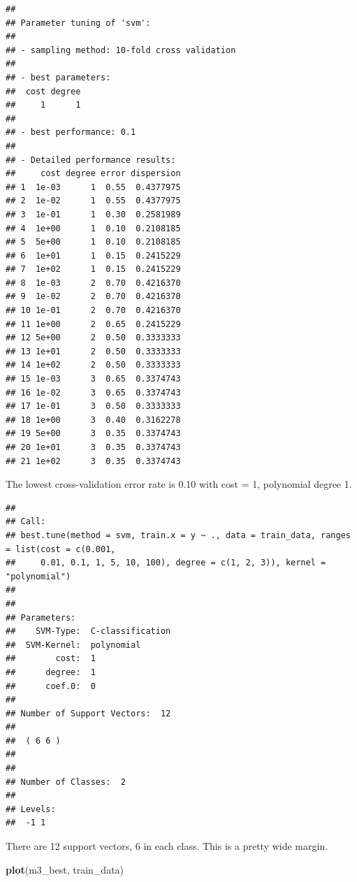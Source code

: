 \documentclass[
]{book}
\newenvironment{Shaded}{\begin{snugshade}}{\end{snugshade}}
\newcommand{\KeywordTok}[1]{\textcolor[rgb]{0.13,0.29,0.53}{\textbf{#1}}}
\newcommand{\NormalTok}[1]{#1}
\newcommand{\OperatorTok}[1]{\textcolor[rgb]{0.81,0.36,0.00}{\textbf{#1}}}
\newcommand{\StringTok}[1]{\textcolor[rgb]{0.31,0.60,0.02}{#1}}
\begin{document}
\begin{verbatim}
## 
## Parameter tuning of 'svm':
## 
## - sampling method: 10-fold cross validation 
## 
## - best parameters:
##  cost degree
##     1      1
## 
## - best performance: 0.1 
## 
## - Detailed performance results:
##     cost degree error dispersion
## 1  1e-03      1  0.55  0.4377975
## 2  1e-02      1  0.55  0.4377975
## 3  1e-01      1  0.30  0.2581989
## 4  1e+00      1  0.10  0.2108185
## 5  5e+00      1  0.10  0.2108185
## 6  1e+01      1  0.15  0.2415229
## 7  1e+02      1  0.15  0.2415229
## 8  1e-03      2  0.70  0.4216370
## 9  1e-02      2  0.70  0.4216370
## 10 1e-01      2  0.70  0.4216370
## 11 1e+00      2  0.65  0.2415229
## 12 5e+00      2  0.50  0.3333333
## 13 1e+01      2  0.50  0.3333333
## 14 1e+02      2  0.50  0.3333333
## 15 1e-03      3  0.65  0.3374743
## 16 1e-02      3  0.65  0.3374743
## 17 1e-01      3  0.50  0.3333333
## 18 1e+00      3  0.40  0.3162278
## 19 5e+00      3  0.35  0.3374743
## 20 1e+01      3  0.35  0.3374743
## 21 1e+02      3  0.35  0.3374743
\end{verbatim}

The lowest cross-validation error rate is 0.10 with cost = 1, polynomial degree 1.

\begin{Shaded}
\end{Shaded}

\begin{verbatim}
## 
## Call:
## best.tune(method = svm, train.x = y ~ ., data = train_data, ranges = list(cost = c(0.001, 
##     0.01, 0.1, 1, 5, 10, 100), degree = c(1, 2, 3)), kernel = "polynomial")
## 
## 
## Parameters:
##    SVM-Type:  C-classification 
##  SVM-Kernel:  polynomial 
##        cost:  1 
##      degree:  1 
##      coef.0:  0 
## 
## Number of Support Vectors:  12
## 
##  ( 6 6 )
## 
## 
## Number of Classes:  2 
## 
## Levels: 
##  -1 1
\end{verbatim}

There are 12 support vectors, 6 in each class. This is a pretty wide margin.

\begin{Shaded}
\begin{Highlighting}[]
\KeywordTok{plot}\NormalTok{(m3_best, train_data)}
\end{Highlighting}
\end{Shaded}
\end{document}
